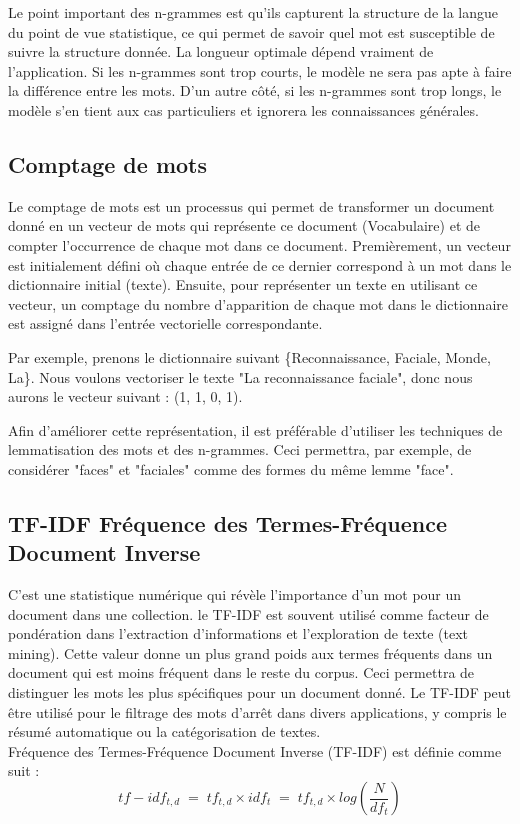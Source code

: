      Le point important des n-grammes est qu'ils capturent la structure de la langue du point de vue statistique, ce qui permet de savoir quel mot est susceptible de suivre la structure donnée. La longueur optimale dépend vraiment de l'application. Si les n-grammes sont trop courts, le modèle ne sera pas apte à faire la différence entre les mots. D'un autre côté, si les n-grammes sont trop longs, le modèle s'en tient aux cas particuliers et ignorera les connaissances générales.
    
    \subsection{Comptage de mots}
    
    Le comptage de mots est un processus qui permet de transformer un document donné en un vecteur de mots qui représente ce document (Vocabulaire) et de compter l'occurrence de chaque mot dans ce document. Premièrement, un vecteur est initialement défini où chaque entrée de ce dernier correspond à un mot dans le dictionnaire initial (texte). Ensuite, pour représenter un texte en utilisant ce vecteur, un comptage du nombre d'apparition de chaque mot dans le dictionnaire est assigné dans l'entrée vectorielle correspondante.

    Par exemple, prenons le dictionnaire suivant \{Reconnaissance, Faciale, Monde, La\}. Nous voulons vectoriser le texte "La reconnaissance faciale", donc nous aurons le vecteur suivant : (1, 1, 0, 1).

    Afin d'améliorer cette représentation, il est préférable d'utiliser les techniques de lemmatisation des mots et des n-grammes. Ceci permettra, par exemple, de considérer "faces" et "faciales" comme des formes du même lemme "face".
    
    \subsection{TF-IDF Fréquence des Termes-Fréquence Document Inverse}
    
    C'est une statistique numérique qui révèle l'importance d'un mot pour un document dans une collection. le TF-IDF est souvent utilisé comme facteur de pondération dans l'extraction d'informations et l'exploration de texte (text mining).
    Cette valeur donne un plus grand poids aux termes fréquents dans un document qui est moins fréquent dans le reste du corpus. Ceci permettra de distinguer les mots les plus spécifiques pour un document donné. Le TF-IDF peut être utilisé pour le filtrage des mots d'arrêt dans divers applications, y compris le résumé automatique ou la catégorisation de textes.\\
    Fréquence des Termes-Fréquence Document Inverse (TF-IDF) est définie comme suit :
    $$
    tf-idf_{t,d} \; = \; tf_{t,d} \times idf_t \; = \; tf_{t,d}
    \times log(\frac{N}{df_t})
    $$
     
